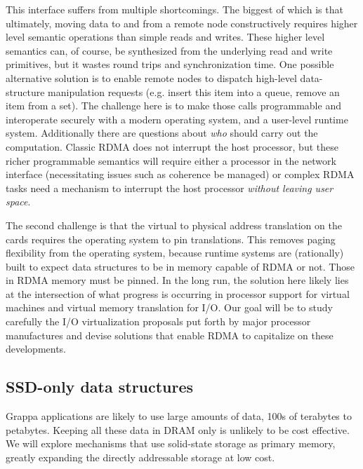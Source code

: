 This interface suffers from multiple shortcomings.  The biggest of which is that ultimately, moving data to and from a remote node constructively requires higher level semantic operations than simple reads and writes.  These higher level semantics can, of course, be synthesized from the underlying read and write primitives, but it wastes round trips and synchronization time.  One possible alternative solution is to enable remote nodes to dispatch high-level data-structure manipulation requests (e.g. insert this item into a queue, remove an item from a set).  The challenge here is to make those calls programmable and interoperate securely with a modern operating system, and a user-level runtime system.  Additionally there are questions about \emph{who} should carry out the computation.  Classic RDMA does not interrupt the host processor, but these richer programmable semantics will require either a processor in the network interface (necessitating issues such as coherence be managed) or complex RDMA tasks need a mechanism to interrupt the host processor \emph{without leaving user space}. 


The second challenge is that the virtual to physical address translation on the cards requires the operating system to pin translations.  This removes paging flexibility from the operating system, because runtime systems are (rationally) built to expect data structures to be in memory capable of RDMA or not.  Those in RDMA memory must be pinned.  In the long run, the solution here likely lies at the intersection of what progress is occurring in processor support for virtual machines and virtual memory translation for I/O.  Our goal will be to study carefully the I/O virtualization proposals put forth by major processor manufactures and devise solutions that enable RDMA to capitalize on these developments.

\subsection{SSD-only data structures}

Grappa applications are likely to use large amounts of data, 100s of terabytes to petabytes. Keeping all these data in DRAM only is unlikely to be cost effective. We will explore mechanisms that use solid-state storage as primary memory, greatly expanding the directly addressable storage at low cost.

